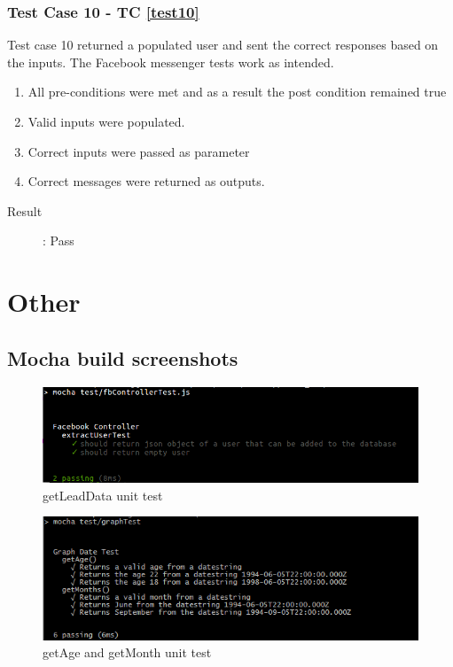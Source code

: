 \documentclass{article}
\begin{document}
\subsubsection{Test Case 10 - TC \ref{test10}}
Test case 10 returned a populated user and sent the correct responses based on the inputs.
The Facebook messenger tests work as intended.
\begin{enumerate}
	\item All pre-conditions were met and as a result the post condition remained true
	\item Valid inputs were populated.
	\item Correct inputs were passed as parameter 
	\item Correct messages were returned as outputs.
\end{enumerate}

\begin{description}
	\item [Result]: Pass 
\end{description}


\pagebreak
\section{Other}

	\subsection{Mocha build screenshots}
	
	\begin{figure}[H]
	\includegraphics[width=15cm]{images/FbControllerTest.png}
	\caption{getLeadData unit test}
	\end{figure}
	
	\begin{figure}[H]
	\includegraphics[width=15cm]{images/getAge.png}
	\caption{getAge and getMonth unit test}
	\end{figure}
	
\end{document}
